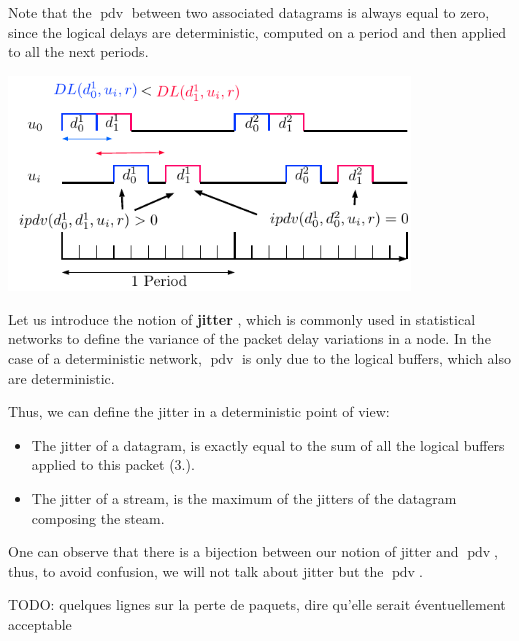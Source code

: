 \documentclass[10pt]{article}
\DeclareMathOperator{\pdv}{pdv}
\newcommand{\todo}[1]{{\color{red} TODO: {#1}}}
\begin{document}
Note that the $\pdv$ between two associated datagrams is always equal to zero, since the logical delays are deterministic, computed on a period and then applied to all the next periods.

\begin{center}
\includegraphics[width=0.8\textwidth]{ipdv}
  \end{center}
  
Let us introduce the notion of {\bf jitter} \cite{guillemin_peak_1992} , which is commonly used in statistical networks to define the variance of the packet delay variations in a node. In the case of a deterministic network, $\pdv$ is only due to the logical buffers, which also are deterministic. 

Thus, we can define the jitter in a deterministic point of view:
\begin{itemize}
\item The jitter of a datagram, is exactly equal to the sum of all the logical buffers applied to this packet (3.).
\item The jitter of a stream, is the maximum of the jitters of the datagram composing the steam.
\end{itemize}

One can observe that there is a bijection between our notion of jitter and $\pdv$, thus, to avoid confusion, we will not talk about jitter but the $\pdv$. 


\todo{quelques lignes sur la perte de paquets, dire qu'elle serait éventuellement acceptable}


\end{document}
